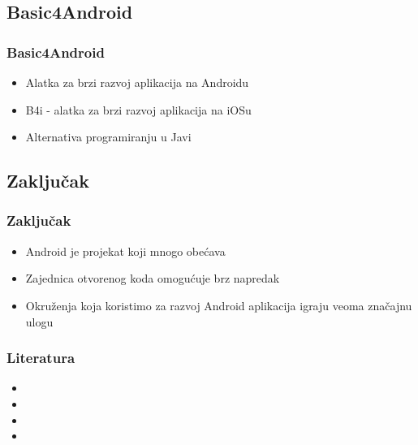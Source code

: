 \documentclass{beamer}
\begin{document}
\begin{frame}
    \section{Basic4Android}
    \frametitle{Basic4Android} 
    \begin{itemize}
	\item Alatka za brzi razvoj aplikacija na Androidu
	\item B4i - alatka za brzi razvoj aplikacija na iOSu
	\item Alternativa programiranju u Javi
   \end{itemize}
\end{frame}

\begin{frame}
    \section{Zaključak}
    \frametitle{Zaključak} 
    \begin{itemize}
	\item Android je projekat koji mnogo obećava
	\item Zajednica otvorenog koda omogućuje brz napredak
	\item Okruženja koja koristimo za razvoj Android aplikacija igraju veoma značajnu ulogu
	
   \end{itemize}
\end{frame}

\begin{frame}
    \frametitle{Literatura}
    \begin{itemize}
	\item
	\item 
	\item 
	\item  
   \end{itemize}
\end{frame}
\end{document}
